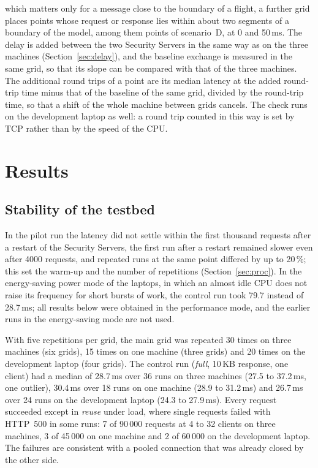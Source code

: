 \documentclass[conference,a4paper]{IEEEtran}
\newcommand{\newtext}[1]{{\color{blue}#1}}
\begin{document}
{{which matters only for a message close to the boundary of a flight, a further grid places points
whose request or response lies within about two segments of a boundary of the model, among them
points of scenario~D, at 0 and 50\,ms.} The delay is added between the two Security Servers in the same way as on
the three machines (Section~\ref{sec:delay}), and the baseline exchange is measured in the same grid,
so that its slope can be compared with that of the three machines. \newtext{The additional round
trips of a point are its median latency at the added round-trip time minus that of the baseline of
the same grid, divided by the round-trip time, so that a shift of the whole machine between grids
cancels. The check runs on the development laptop as well: a round trip counted in this way is set
by TCP rather than by the speed of the CPU.}\par}

\section{Results}

\subsection{Stability of the testbed}

\newtext{In the pilot run the latency did not settle within the first thousand requests after a
restart of the Security Servers, the first run after a restart remained slower even after 4000
requests, and repeated runs at the same point differed by up to 20\,\%; this set the warm-up and the
number of repetitions (Section~\ref{sec:proc}). In the energy-saving power mode of the laptops, in
which an almost idle CPU does not raise its frequency for short bursts of work, the control run took
79.7 instead of 28.7\,ms; all results below were obtained in the performance mode, and the earlier
runs in the energy-saving mode are not used.}

With five repetitions per grid, the main grid was repeated 30 times on three machines (six grids), 15
times on one machine (three grids) and 20 times on the development laptop (four grids). The control run (\emph{full}, 10\,KB response, one
client) had a median of 28.7\,ms over 36 runs on three machines (27.5 to 37.2\,ms, one outlier),
30.4\,ms over 18 runs on one machine (28.9 to 31.2\,ms) and 26.7\,ms over 24 runs on the development
laptop (24.3 to 27.9\,ms). Every request succeeded except in \emph{reuse} under load, where single
requests failed with HTTP~500 in some runs: 7 of 90\,000 requests at 4 to 32 clients on three
machines, 3 of 45\,000 on one machine and 2 of 60\,000 on the development laptop. The failures are
consistent with a pooled connection that was already closed by the other side.
\end{document}
